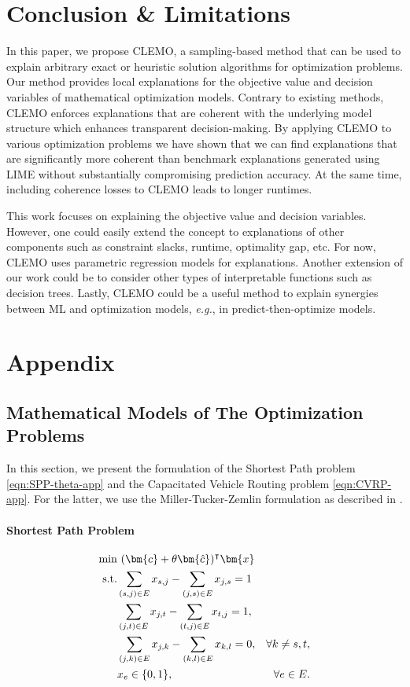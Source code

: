 \documentclass{article}
\theoremstyle{plain}
\theoremstyle{definition}
\theoremstyle{remark}
\begin{document}
\section{Conclusion \& Limitations}
In this paper, we propose CLEMO, a sampling-based method that can be used to explain arbitrary exact or heuristic solution algorithms for optimization problems. Our method provides local explanations for the objective value and decision variables of mathematical optimization models. Contrary to existing methods, CLEMO enforces explanations that are coherent with the underlying model structure which enhances transparent decision-making. By applying CLEMO to various optimization problems we have shown that we can find explanations that are significantly more coherent than benchmark explanations generated using LIME without substantially compromising prediction accuracy. At the same time, including coherence losses to CLEMO leads to longer runtimes.

This work focuses on explaining the objective value and decision variables. However, one could easily extend the concept to explanations of other components such as constraint slacks, runtime, optimality gap, etc. For now, CLEMO uses parametric regression models for explanations. Another extension of our work could be to consider other types of interpretable functions such as decision trees. Lastly, CLEMO could be a useful method to explain synergies between ML and optimization models, \textit{e.g.}, in predict-then-optimize models.





\newpage
 
\appendix
\onecolumn
\section{Appendix}
\label{sec:app}
\subsection{Mathematical Models of The Optimization Problems}
In this section, we present the formulation of the Shortest Path problem \cref{eqn:SPP-theta-app} and the Capacitated Vehicle Routing problem \cref{eqn:CVRP-app}. For the latter, we use the Miller-Tucker-Zemlin formulation as described in \cite{kara_note_2004}.
\paragraph{Shortest Path Problem}
\begin{align}\label{eqn:SPP-theta-app}
 \min &  \ (\bm{c}+\theta \bm{\hat{c}})^\intercal\bm{x}&\\
 \text{s.t.} & \sum_{(s,j)\in E} x_{s,j} -  \sum_{(j,s)\in E} x_{j,s}=1&\notag\\
  & \sum_{(j,t)\in E} x_{j,t} -  \sum_{(t,j)\in E} x_{t,j}=1,&\notag\\
 & \sum_{(j,k)\in E} x_{j,k} -  \sum_{(k,l)\in E} x_{k,l}=0, & \forall k \neq s,t,\notag\\
& x_{e}\in\{0,1\},& \forall e\in E. \notag
\end{align}
\end{document}

